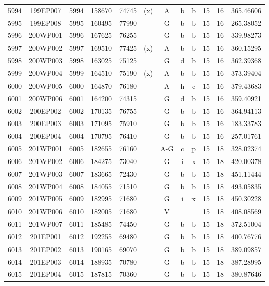 \begin{tabular}{|*{12}{c|}}
5994 & 199EP007 & 5994 & 158670 & 74745 & (x) & A & b & b & 15 & 16 & 365.46606 \\ 
5995 & 199EP008 & 5995 & 160495 & 77990 &  & G & b & b & 15 & 16 & 265.38052 \\ 
5996 & 200WP001 & 5996 & 167625 & 76255 &  & G & b & b & 15 & 16 & 339.98273 \\ 
5997 & 200WP002 & 5997 & 169510 & 77425 & (x) & A & b & b & 15 & 16 & 360.15295 \\ 
5998 & 200WP003 & 5998 & 163025 & 75125 &  & G & d & b & 15 & 16 & 362.39368 \\ 
5999 & 200WP004 & 5999 & 164510 & 75190 & (x) & A & b & b & 15 & 16 & 373.39404 \\ 
6000 & 200WP005 & 6000 & 164870 & 76180 &  & A & h & c & 15 & 16 & 379.43683 \\ 
6001 & 200WP006 & 6001 & 164200 & 74315 &  & G & d & b & 15 & 16 & 359.40921 \\ 
6002 & 200EP002 & 6002 & 170135 & 76755 &  & G & b & b & 15 & 16 & 364.94113 \\ 
6003 & 200EP003 & 6003 & 171095 & 75910 &  & G & b & b & 15 & 16 & 183.33783 \\ 
6004 & 200EP004 & 6004 & 170795 & 76410 &  & G & b & b & 15 & 16 & 257.01761 \\ 
6005 & 201WP001 & 6005 & 182655 & 76160 &  & A-G & c & p & 15 & 18 & 328.02374 \\ 
6006 & 201WP002 & 6006 & 184275 & 73040 &  & G & i & x & 15 & 18 & 420.00378 \\ 
6007 & 201WP003 & 6007 & 183665 & 72430 &  & G & b & b & 15 & 18 & 451.11444 \\ 
6008 & 201WP004 & 6008 & 184055 & 71510 &  & G & b & b & 15 & 18 & 493.05835 \\ 
6009 & 201WP005 & 6009 & 182995 & 71680 &  & G & i & x & 15 & 18 & 450.30228 \\ 
6010 & 201WP006 & 6010 & 182005 & 71680 &  & V &  &  & 15 & 18 & 408.08569 \\ 
6011 & 201WP007 & 6011 & 185485 & 74450 &  & G & b & b & 15 & 18 & 372.51004 \\ 
6012 & 201EP001 & 6012 & 192255 & 69480 &  & G & b & b & 15 & 18 & 400.76776 \\ 
6013 & 201EP002 & 6013 & 190165 & 69070 &  & G & b & b & 15 & 18 & 389.09857 \\ 
6014 & 201EP003 & 6014 & 188935 & 70780 &  & G & b & b & 15 & 18 & 387.28995 \\ 
6015 & 201EP004 & 6015 & 187815 & 70360 &  & G & b & b & 15 & 18 & 380.87646 \\ 

\end{tabular}
